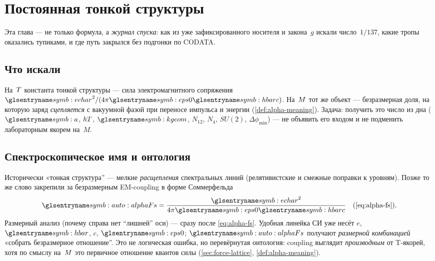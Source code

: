 \chapter{Постоянная тонкой структуры}
\label{ch:alpha}

Эта глава --- не только формула, а \emph{журнал спуска}:
как из уже зафиксированного носителя и закона~$g$ искали число~$1/137$,
какие тропы оказались тупиками, и где путь закрылся без подгонки по CODATA.

\section{Что искали}

На~$T$ константа тонкой структуры --- сила электромагнитного сопряжения
$\chargeE^2/(4\pi\constEpsZero\planckHbar c)$.
На~$M$ тот же объект --- безразмерная доля, на которую заряд
\emph{сцепляется} с вакуумной фазой при переносе импульса и энергии
(\cref{def:alpha-meaning}).
Задача: получить это число из дна
($\caStepSpace$, $hT$, $\caKappaGeom$, $N_{12}$, $N_4$, $SU(2)$, $\Delta\phi_{\min}$)
--- не объявить его входом и не подменить лабораторным якорем на~$M$.

\section{Спектроскопическое имя и онтология}
\label{sec:alpha-name}

Исторически «тонкая структура'' --- мелкие \emph{расщепления} спектральных линий
(релятивистские и смежные поправки к уровням).
Позже то же слово закрепили за безразмерным EM-coupling в форме Соммерфельда
\[
  \alphaFs=\frac{\chargeE^2}{4\pi\constEpsZero\planckHbar c}
  \quad\text{(\cref{eq:alpha-fs}).}
\]
Размерный анализ (почему справа нет ``лишней'' оси) --- сразу после \eqref{eq:alpha-fs}.
Удобная линейка СИ уже несёт $e$, $\planckHbar$, $c$, $\constEpsZero$;
$\alphaFs$ получают \emph{размерной комбинацией} «собрать безразмерное отношение''.
Это не логическая ошибка, но перевёрнутая онтология:
coupling выглядит \emph{производным} от T-якорей, хотя по смыслу на~$M$ это первичное
отношение квантов силы (\cref{sec:force-lattice}, \cref{def:alpha-meaning}).

